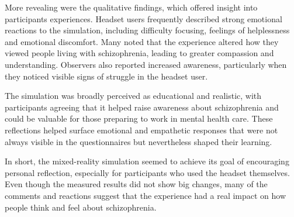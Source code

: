 \vspace{1em}

More revealing were the qualitative findings, which offered insight into participants experiences. Headset users frequently described strong emotional reactions to the simulation, including difficulty focusing, feelings of helplessness and emotional discomfort. Many noted that the experience altered how they viewed people living with schizophrenia, leading to greater compassion and understanding. Observers also reported increased awareness, particularly when they noticed visible signs of struggle in the headset user.

The simulation was broadly perceived as educational and realistic, with participants agreeing that it helped raise awareness about schizophrenia and could be valuable for those preparing to work in mental health care. These reflections helped surface emotional and empathetic responses that were not always visible in the questionnaires but nevertheless shaped their learning.

\vspace{1em}

In short, the mixed-reality simulation seemed to achieve its goal of encouraging personal reflection, especially for participants who used the headset themselves. Even though the measured results did not show big changes, many of the comments and reactions suggest that the experience had a real impact on how people think and feel about schizophrenia.